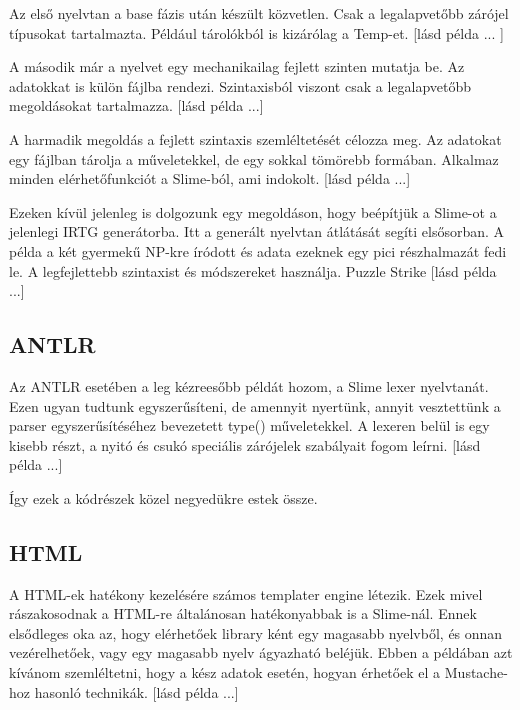 {Az első nyelvtan a base fázis után készült közvetlen.
Csak a legalapvetőbb zárójel típusokat tartalmazta.
Például tárolókból is kizárólag a Temp-et.
[lásd példa ... ]

A második már a nyelvet egy mechanikailag fejlett szinten mutatja be.
Az adatokkat is külön fájlba rendezi.
Szintaxisból viszont csak a legalapvetőbb megoldásokat tartalmazza.
[lásd példa ...]

A harmadik megoldás a fejlett szintaxis szemléltetését célozza meg.
Az adatokat egy fájlban tárolja a műveletekkel, de egy sokkal tömörebb formában.
Alkalmaz minden elérhetőfunkciót a Slime-ból, ami indokolt.
[lásd példa ...]

Ezeken kívül jelenleg is dolgozunk egy megoldáson, hogy beépítjük a Slime-ot a jelenlegi IRTG generátorba.
Itt a generált nyelvtan átlátását segíti elsősorban.
A példa a két gyermekű NP-kre íródott és adata ezeknek egy pici részhalmazát fedi le.
A legfejlettebb szintaxist és módszereket használja. Puzzle Strike
[lásd példa ...]

\subsection{ANTLR}
Az ANTLR esetében a leg kézreesőbb példát hozom, a Slime lexer nyelvtanát. 
Ezen ugyan tudtunk egyszerűsíteni, de amennyit nyertünk, annyit vesztettünk a parser egyszerűsítéséhez bevezetett type() műveletekkel.
A lexeren belül is egy kisebb részt, a nyitó és csukó speciális zárójelek szabályait fogom leírni.
[lásd példa ...]

Így ezek a kódrészek közel negyedükre estek össze.


\subsection{HTML}
A HTML-ek hatékony kezelésére számos templater engine létezik.
Ezek mivel rászakosodnak a HTML-re általánosan hatékonyabbak is a Slime-nál.
Ennek elsődleges oka az, hogy elérhetőek library ként egy magasabb nyelvből, és onnan vezérelhetőek, vagy egy magasabb nyelv ágyazható beléjük.
Ebben a példában azt kívánom szemléltetni, hogy a kész adatok esetén, hogyan érhetőek el a Mustache-hoz hasonló technikák.
[lásd példa ...]

}
